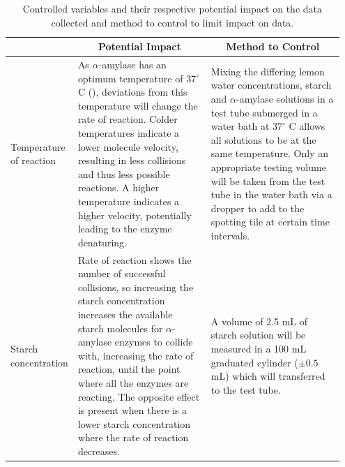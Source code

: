 \documentclass[12pt]{article}
\begin{document}
\begin{table}[H]
\centering
\caption{Controlled variables and their respective potential impact on the data collected and method to control to limit impact on data.}\label{controlled}
\begin{tabular}{|p{0.15\linewidth}|p{0.4\linewidth}|p{0.4\linewidth}|}
\hline
\rowcolor[HTML]{C0C0C0} 
    \multicolumn{1}{|c|}{Variable} 
    & \multicolumn{1}{|c|}{Potential Impact} 
    & \multicolumn{1}{|c|}{Method to Control} \\ 
\hline
    Temperature of reaction 
    & As $\alpha$-amylase has an optimum temperature of $37^\circ$ C (\citeauthor{worthington_biochemical}), deviations from this temperature will change the rate of reaction. Colder temperatures indicate a lower molecule velocity, resulting in less collisions and thus less possible reactions. A higher temperature indicates a higher velocity, potentially leading to the enzyme denaturing. 
    & Mixing the differing lemon water concentrations, starch and $\alpha$-amylase solutions in a test tube submerged in a water bath at $37^\circ$ C allows all solutions to be at the same temperature. Only an appropriate testing volume will be taken from the test tube in the water bath via a dropper to add to the spotting tile at certain time intervals. \\ 
\hline
    Starch concentration 
    & Rate of reaction shows the number of successful collisions, so increasing the starch concentration increases the available starch molecules for $\alpha$-amylase enzymes to collide with, increasing the rate of reaction, until the point where all the enzymes are reacting. The opposite effect is present when there is a lower starch concentration where the rate of reaction decreases.
    & A volume of 2.5 mL of starch solution will be measured in a 100 mL graduated cylinder ($\pm 0.5$ mL) which will transferred to the test tube.   \\
\hline
\end{tabular}
\end{table}
\end{document}
